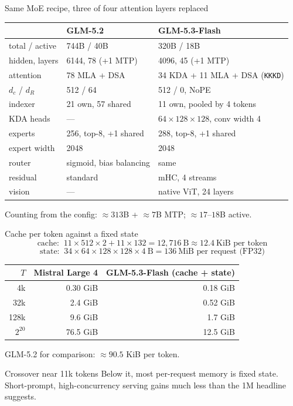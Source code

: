 \documentclass[handout]{beamer}
\begin{document}
\begin{frame}{Same MoE recipe, three of four attention layers replaced}
  \footnotesize
  \begin{tabular}{@{}lll@{}}
    \toprule
    & GLM-5.2 & GLM-5.3-Flash \\
    \midrule
    total / active & 744B / 40B & 320B / 18B \\
    hidden, layers & 6144, 78 (+1 MTP) & 4096, 45 (+1 MTP) \\
    attention & 78 MLA + DSA & 34 KDA + 11 MLA + DSA (\texttt{KKKD}) \\
    $d_c$ / $d_R$ & 512 / 64 & 512 / 0, NoPE \\
    indexer & 21 own, 57 shared & 11 own, pooled by 4 tokens \\
    KDA heads & --- & $64\times128\times128$, conv width 4 \\
    experts & 256, top-8, +1 shared & 288, top-8, +1 shared \\
    expert width & 2048 & 2048 \\
    router & sigmoid, bias balancing & same \\
    residual & standard & mHC, 4 streams \\
    vision & --- & native ViT, 24 layers \\
    \bottomrule
  \end{tabular}
  \par\vspace{8pt}
  \small Counting from the config: $\approx313$B + $\approx7$B MTP; $\approx17$--$18$B active.
\end{frame}

\begin{frame}{Cache per token against a fixed state}
  \small
  \[
    \text{cache: }\ 11\times512\times2+11\times132=12{,}716\ \text{B}\approx12.4\ \text{KiB per token}
  \]
  \[
    \text{state: }\ 34\times64\times128\times128\times4\ \text{B}=136\ \text{MiB per request (FP32)}
  \]
  \centering
  \begin{tabular}{@{}rrr@{}}
    \toprule
    $T$ & Mistral Large 4 & GLM-5.3-Flash (cache + state) \\
    \midrule
    4k & 0.30 GiB & 0.18 GiB \\
    32k & 2.4 GiB & 0.52 GiB \\
    128k & 9.6 GiB & 1.7 GiB \\
    $2^{20}$ & 76.5 GiB & 12.5 GiB \\
    \bottomrule
  \end{tabular}
  \par\vspace{6pt}
  \raggedright
  GLM-5.2 for comparison: $\approx90.5$ KiB per token.
  \begin{alertblock}{Crossover near 11k tokens}
    \small Below it, most per-request memory is fixed state. Short-prompt, high-concurrency serving gains much less than the 1M headline suggests.
  \end{alertblock}
\end{frame}
\end{document}
